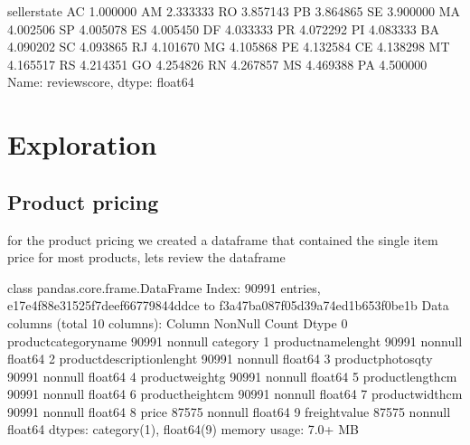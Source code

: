 \documentclass[letterpaper,10pt,english]{jupyterBook}
\begin{document}
\begin{sphinxVerbatim}[commandchars=\\\{\}]
seller\PYGZus{}state
AC    1.000000
AM    2.333333
RO    3.857143
PB    3.864865
SE    3.900000
MA    4.002506
SP    4.005078
ES    4.005450
DF    4.033333
PR    4.072292
PI    4.083333
BA    4.090202
SC    4.093865
RJ    4.101670
MG    4.105868
PE    4.132584
CE    4.138298
MT    4.165517
RS    4.214351
GO    4.254826
RN    4.267857
MS    4.469388
PA    4.500000
Name: review\PYGZus{}score, dtype: float64
\end{sphinxVerbatim}


\section{Exploration}
\label{\detokenize{c7_case_studies/Olist:exploration}}

\subsection{Product pricing}
\label{\detokenize{c7_case_studies/Olist:id1}}
\sphinxAtStartPar
for the product pricing we created a dataframe that contained the single item price for most products, lets review the dataframe

\begin{sphinxVerbatim}[commandchars=\\\{\}]
\end{sphinxVerbatim}

\begin{sphinxVerbatim}[commandchars=\\\{\}]
\PYGZlt{}class \PYGZsq{}pandas.core.frame.DataFrame\PYGZsq{}\PYGZgt{}
Index: 90991 entries, e17e4f88e31525f7deef66779844ddce to f3a47ba087f05d39a74ed1b653f0be1b
Data columns (total 10 columns):
 \PYGZsh{}   Column                      Non\PYGZhy{}Null Count  Dtype   
\PYGZhy{}\PYGZhy{}\PYGZhy{}  \PYGZhy{}\PYGZhy{}\PYGZhy{}\PYGZhy{}\PYGZhy{}\PYGZhy{}                      \PYGZhy{}\PYGZhy{}\PYGZhy{}\PYGZhy{}\PYGZhy{}\PYGZhy{}\PYGZhy{}\PYGZhy{}\PYGZhy{}\PYGZhy{}\PYGZhy{}\PYGZhy{}\PYGZhy{}\PYGZhy{}  \PYGZhy{}\PYGZhy{}\PYGZhy{}\PYGZhy{}\PYGZhy{}   
 0   product\PYGZus{}category\PYGZus{}name       90991 non\PYGZhy{}null  category
 1   product\PYGZus{}name\PYGZus{}lenght         90991 non\PYGZhy{}null  float64 
 2   product\PYGZus{}description\PYGZus{}lenght  90991 non\PYGZhy{}null  float64 
 3   product\PYGZus{}photos\PYGZus{}qty          90991 non\PYGZhy{}null  float64 
 4   product\PYGZus{}weight\PYGZus{}g            90991 non\PYGZhy{}null  float64 
 5   product\PYGZus{}length\PYGZus{}cm           90991 non\PYGZhy{}null  float64 
 6   product\PYGZus{}height\PYGZus{}cm           90991 non\PYGZhy{}null  float64 
 7   product\PYGZus{}width\PYGZus{}cm            90991 non\PYGZhy{}null  float64 
 8   price                       87575 non\PYGZhy{}null  float64 
 9   freight\PYGZus{}value               87575 non\PYGZhy{}null  float64 
dtypes: category(1), float64(9)
memory usage: 7.0+ MB
\end{sphinxVerbatim}
\end{document}
